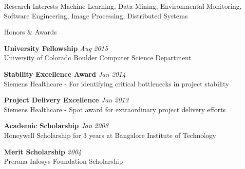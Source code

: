 \documentclass{resume}
\begin{document}

\begin{rSection}{Research Interests}
Machine Learning, Data Mining, Environmental Monitoring, Software Engineering, Image Processing, Distributed Systems
\end{rSection}


\begin{rSection}{Honors \& Awards}

{\bf University Fellowship} \hfill {\em Aug 2015}
\\ University of Colorado Boulder Computer Science Department

{\bf Stability Excellence Award} \hfill {\em Jan 2014}
\\ Siemens Healthcare - For identifying critical bottlenecks in project stability

{\bf Project Delivery Excellence} \hfill {\em Jan 2013}
\\ Siemens Healthcare - Spot award for extraordinary project delivery efforts

{\bf Academic Scholarship} \hfill {\em Jan 2008}
\\ Honeywell Scholarship for 3 years at Bangalore Institute of Technology

{\bf Merit Scholarship} \hfill {\em 2004}
\\ Prerana Infosys Foundation Scholarship

\end{rSection}
\end{document}
